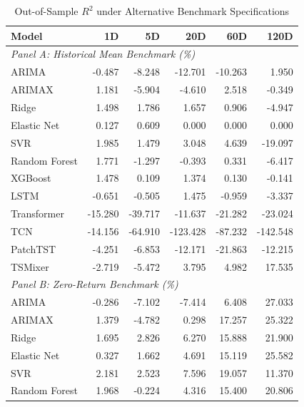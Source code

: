 \documentclass[12pt,twoside]{ord}
\begin{document}
\begin{table}[htbp]
\centering
\caption{Out-of-Sample $R^2$ under Alternative Benchmark Specifications}
\label{tab:benchmark_comparison}
\small
\setlength{\tabcolsep}{5pt}
\renewcommand{\arraystretch}{1.12}
\begin{tabular}{lrrrrr}
\hline
\textbf{Model} & \textbf{1D} & \textbf{5D} & \textbf{20D} & \textbf{60D} & \textbf{120D} \\
\hline
\multicolumn{6}{l}{\textit{Panel A: Historical Mean Benchmark (\%)}} \\
\hline
ARIMA          & -0.487 & -8.248 & -12.701 & -10.263 &  1.950 \\
ARIMAX         &  1.181 & -5.904 &  -4.610 &   2.518 & -0.349 \\
Ridge          &  1.498 &  1.786 &   1.657 &   0.906 & -4.947 \\
Elastic Net    &  0.127 &  0.609 &   0.000 &   0.000 &  0.000 \\
SVR            &  1.985 &  1.479 &   3.048 &   4.639 & -19.097 \\
Random Forest  &  1.771 & -1.297 &  -0.393 &   0.331 & -6.417 \\
XGBoost        &  1.478 &  0.109 &   1.374 &   0.130 & -0.141 \\
LSTM           & -0.651 & -0.505 &   1.475 &  -0.959 & -3.337 \\
Transformer    & -15.280 & -39.717 & -11.637 & -21.282 & -23.024 \\
TCN            & -14.156 & -64.910 & -123.428 & -87.232 & -142.548 \\
PatchTST       & -4.251 & -6.853 & -12.171 & -21.863 & -12.215 \\
TSMixer        & -2.719 & -5.472 &   3.795 &   4.982 & 17.535 \\
\hline
\multicolumn{6}{l}{\textit{Panel B: Zero-Return Benchmark (\%)}} \\
\hline
ARIMA          & -0.286 & -7.102 &  -7.414 &   6.408 & 27.033 \\
ARIMAX         &  1.379 & -4.782 &   0.298 &  17.257 & 25.322 \\
Ridge          &  1.695 &  2.826 &   6.270 &  15.888 & 21.900 \\
Elastic Net    &  0.327 &  1.662 &   4.691 &  15.119 & 25.582 \\
SVR            &  2.181 &  2.523 &   7.596 &  19.057 & 11.370 \\
Random Forest  &  1.968 & -0.224 &   4.316 &  15.400 & 20.806 \\

\end{tabular}
\end{table}
\end{document}
